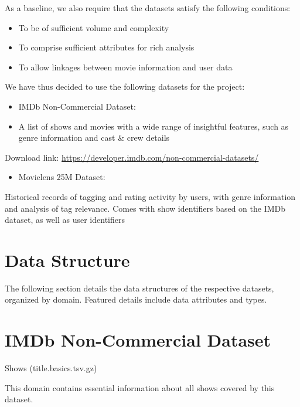 \documentclass[10pt,titlepage]{article}
\begin{document}
As a baseline, we also require that the datasets satisfy the following conditions:

\begin{itemize}
  \item To be of sufficient volume and complexity

  \item To comprise sufficient attributes for rich analysis

  \item To allow linkages between movie information and user data

\end{itemize}


We have thus decided to use the following datasets for the project:

\begin{itemize}
  \item IMDb Non-Commercial Dataset:

  \item A list of shows and movies with a wide range of insightful features, such as genre information and cast \& crew details

\end{itemize}

Download link: \href{https://developer.imdb.com/non-commercial-datasets/}{https://developer.imdb.com/non-commercial-datasets/}

\begin{itemize}
  \item Movielens 25M Dataset:
\end{itemize}

Historical records of tagging and rating activity by users, with genre information and analysis of tag relevance. Comes with show identifiers based on the IMDb dataset, as well as user identifiers

\section{Data Structure}
The following section details the data structures of the respective datasets, organized by domain. Featured details include data attributes and types.

\section{IMDb Non-Commercial Dataset}
Shows (title.basics.tsv.gz)

This domain contains essential information about all shows covered by this dataset.
\end{document}
